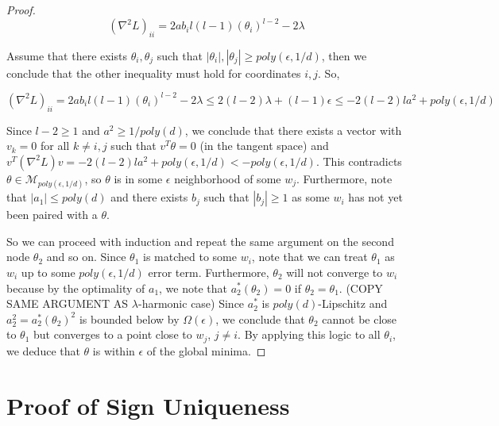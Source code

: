 \documentclass{article}
\begin{document}
\begin{proof}
\[(\nabla^2 L)_{ii} = 2a b_i l(l-1)(\theta_i)^{l-2} - 2 \lambda\]

Assume that there exists $\theta_i, \theta_j$ such that $|\theta_i|,|\theta_j| \geq poly(\epsilon,1/d)$, then we conclude that the other inequality must hold for coordinates $i, j$. So,

\[(\nabla^2 L)_{ii} = 2a b_i l(l-1)(\theta_i)^{l-2} - 2 \lambda \leq 2(l-2)\lambda + (l-1)\epsilon \leq -2(l-2)la^2 + poly(\epsilon,1/d)\]

Since $l-2 \geq 1$ and $a^2 \geq 1/poly(d)$, we conclude that there exists a vector with $v_k = 0$ for all $k\neq i, j$ such that $v^T\theta = 0$ (in the tangent space) and $v^T(\nabla^2 L) v  = -2(l-2)l a^2 + poly(\epsilon,1/d) < -poly(\epsilon,1/d)$. This contradicts $\theta \in \mathcal{M}_{poly(\epsilon,1/d)}$, so $\theta$ is in some $\epsilon$ neighborhood of some $w_j$. Furthermore, note that $|a_1| \leq poly(d)$ and there exists $b_j$ such that $|b_j| \geq 1$ as some $w_i$ has not yet been paired with a $\theta$.

So we can proceed with induction and repeat the same argument on the second node $\theta_2$ and so on. Since $\theta_1$ is matched to some $w_i$, note that we can treat $\theta_1$ as $w_i$ up to some $poly(\epsilon,1/d)$ error term. Furthermore, $\theta_2$ will not converge to $w_i$ because by the optimality of $a_1$, we note that $a_2^*(\theta_2) = 0$ if $\theta_2 =\theta_1$. (COPY SAME ARGUMENT AS $\lambda$-harmonic case) Since $a_2^*$ is $poly(d)$-Lipschitz and $a_2^2 = a_2^*(\theta_2)^2$ is bounded below by $\Omega(\epsilon)$, we conclude that $\theta_2$ cannot be close to $\theta_1$ but converges to a point close to $w_{j}$, $j\neq i$. By applying this logic to all $\theta_i$, we deduce that $\theta$ is within $\epsilon$ of the global minima.

\end{proof}


\section{Proof of Sign Uniqueness}


\end{document}
